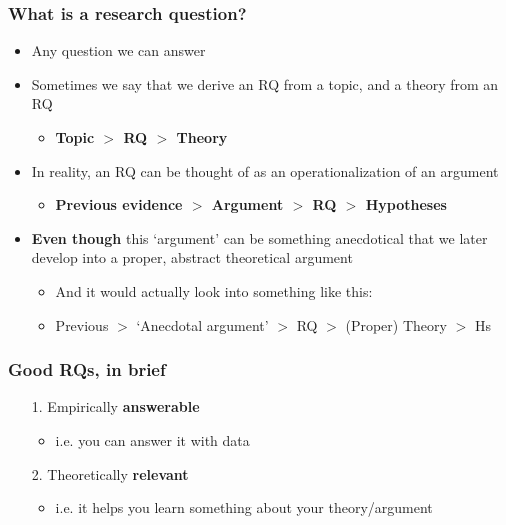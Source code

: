 \documentclass[aspectratio=43]{beamer}
\begin{document}
\begin{frame}
\frametitle{What is a research question?}
\centering

\begin{itemize}
  \item<1-> Any question we can answer
  \item<1-> Sometimes we say that we derive an RQ from a topic, and a theory from an RQ
  \begin{itemize}
    \item \textbf{Topic $>$ RQ $>$ Theory}
  \end{itemize}
  \item<2-> In reality, an RQ can be thought of as an operationalization of an argument
  \begin{itemize}
    \item \textbf{Previous evidence $>$ Argument $>$ RQ $>$ Hypotheses}
  \end{itemize}
  \item<2-> \textbf{Even though} this `argument' can be something anecdotical that we later develop into a proper, abstract theoretical argument
  \begin{itemize}
    \item<3-> And it would actually look into something like this:
    \item<3-> Previous $>$ `Anecdotal argument' $>$ RQ $>$ (Proper) Theory $>$ Hs
  \end{itemize}
\end{itemize}

\end{frame}

\begin{frame}
\frametitle{Good RQs, in brief}
\centering

\begin{itemize}
  \item[1.] Empirically \textbf{answerable}
  \begin{itemize}
    \item i.e. you can answer it with data
  \end{itemize}
  \item[2.] Theoretically \textbf{relevant}
  \begin{itemize}
    \item i.e. it helps you learn something about your theory/argument
  \end{itemize}
\end{itemize}

\end{frame}
\end{document}
